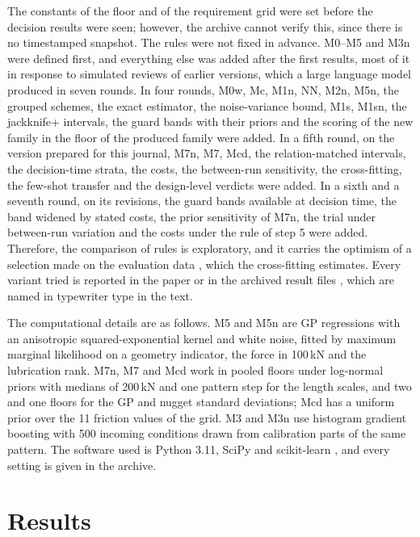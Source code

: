 \documentclass[pdflatex,sn-basic,lineno]{sn-jnl}
\begin{document}
The constants of the floor and of the requirement grid were set before the decision results were seen; however, the archive cannot verify this, since there is no timestamped snapshot. The rules were not fixed in advance. M0--M5 and M3n were defined first, and everything else was added after the first results, most of it in response to simulated reviews of earlier versions, which a large language model produced in seven rounds. In four rounds, M0w, Mc, M1n, NN, M2n, M5n, the grouped schemes, the exact estimator, the noise-variance bound, M1s, M1sn, the jackknife+ intervals, the guard bands with their priors and the scoring of the new family in the floor of the produced family were added. In a fifth round, on the version prepared for this journal, M7n, M7, Mcd, the relation-matched intervals, the decision-time strata, the costs, the between-run sensitivity, the cross-fitting, the few-shot transfer and the design-level verdicts were added. In a sixth and a seventh round, on its revisions, the guard bands available at decision time, the band widened by stated costs, the prior sensitivity of M7n, the trial under between-run variation and the costs under the rule of step 5 were added. Therefore, the comparison of rules is exploratory, and it carries the optimism of a selection made on the evaluation data \citep{cawley2010over, varma2006bias}, which the cross-fitting estimates. Every variant tried is reported in the paper or in the archived result files \citep{canseven2026archive}, which are named in typewriter type in the text.

The computational details are as follows. M5 and M5n are GP regressions with an anisotropic squared-exponential kernel and white noise, fitted by maximum marginal likelihood on a geometry indicator, the force in 100\,kN and the lubrication rank. M7n, M7 and Mcd work in pooled floors under log-normal priors with medians of 200\,kN and one pattern step for the length scales, and two and one floors for the GP and nugget standard deviations; Mcd has a uniform prior over the 11 friction values of the grid. M3 and M3n use histogram gradient boosting with 500 incoming conditions drawn from calibration parts of the same pattern. The software used is Python 3.11, SciPy and scikit-learn \citep{pedregosa2011scikit}, and every setting is given in the archive.

\section{Results}\label{sec:results}
\end{document}
